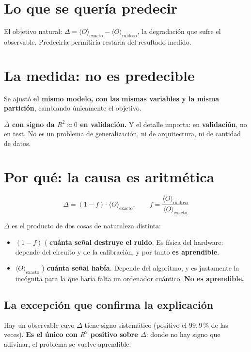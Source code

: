 \section{Lo que se quería predecir}
\label{sec:delta}
El objetivo natural: $\Delta = \langle O \rangle_{\text{exacto}} - \langle O
\rangle_{\text{ruidoso}}$, la degradación que sufre el observable. Predecirla permitiría
restarla del resultado medido.

\section{La medida: no es predecible}
\label{sec:no_predecible}
Se ajustó \textbf{el mismo modelo, con las mismas variables y la misma partición}, cambiando
únicamente el objetivo.

\textbf{$\Delta$ con signo da $R^2 \approx 0$ en validación.} Y el detalle importa: en
\textbf{validación}, no en test. No es un problema de generalización, ni de arquitectura, ni
de cantidad de datos.

\section{Por qué: la causa es aritmética}
\label{sec:causa}
\begin{equation}
\label{eq:delta_factoriza}
\Delta = (1 - f)\cdot\langle O \rangle_{\text{exacto}}, \qquad
f = \frac{\langle O \rangle_{\text{ruidoso}}}{\langle O \rangle_{\text{exacto}}}
\end{equation}

$\Delta$ es el producto de dos cosas de naturaleza distinta:
\begin{itemize}
    \item $(1-f)$ ( \textbf{cuánta señal destruye el ruido}. Es física del hardware: depende
          del circuito y de la calibración, y por tanto \textbf{es aprendible}.
    \item $\langle O \rangle_{\text{exacto}}$ ) \textbf{cuánta señal había}. Depende del
          algoritmo, y es justamente la incógnita para la que haría falta un ordenador
          cuántico. \textbf{No es aprendible.}
\end{itemize}

\subsection{La excepción que confirma la explicación}
Hay un observable cuyo $\Delta$ tiene signo sistemático (positivo el $99{,}9$\,\% de las veces).
\textbf{Es el único con $R^2$ positivo sobre $\Delta$}: donde no hay signo que adivinar, el
problema se vuelve aprendible.

